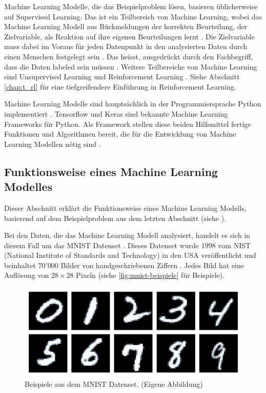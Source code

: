 Machine Learning Modelle, die das Beispielproblem lösen, basieren üblicherweise
auf Supervised Learning. Das ist ein Teilbereich von Machine Learning, wobei das
Machine Learning Modell aus Rückmeldungen der korrekten Beurteilung, der
Zielvariable, als Reaktion auf ihre eigenen Beurteilungen lernt
\cite{laurenz_wuttke_was_2021-1}. Die Zielvariable muss dabei im Voraus für jeden
Datenpunkt in den analysierten Daten durch einen Menschen festgelegt sein
\cite{trahasch_31_2020}. Das heisst, ausgedrückt durch den Fachbegriff, dass
die Daten labeled sein müssen \cite{luis_g_serrano_21_2021}. Weitere Teilbereiche
von Machine Learning sind Unsupervised Learning und Reinforcement Learning
\cite{arora_supervised_2020}. Siehe Abschnitt \ref{chap:t_rl} für eine
tiefgreifendere Einführung in Reinforcement Learning.
 
Machine Learning Modelle sind hauptsächlich in der Programmiersprache Python
implementiert \cite{sadie_bennett_why_2019}. Tensorflow und Keras sind bekannte
Machine Learning Frameworks für Python. Als Framework stellen diese beiden
Hilfsmittel fertige Funktionen und Algorithmen bereit, die für die Entwicklung
von Machine Learning Modellen nötig sind
\cite{noauthor_tensorflow_2015}\cite{noauthor_keras_2015}.
 
 
\subsection{Funktionsweise eines Machine Learning Modelles}\label{sub:t_ml_func}
Dieser Abschnitt erklärt die Funktionsweise eines Machine Learning Modells,
basierend auf dem Beispielproblem aus dem letzten Abschnitt (siehe ).
 
Bei den Daten, die das Machine Learning Modell analysiert, handelt es sich in
diesem Fall um das MNIST Datenset \cite{yann_lecun_mnist_nodate}. Dieses Datenset
wurde 1998 vom NIST (National Institute of Standards and Technology) in den USA
veröffentlicht und beinhaltet $70'000$ Bilder von handgeschriebenen Ziffern
\cite{yann_lecun_papers_nodate}. Jedes Bild hat eine Auflösung von $28\times28$
Pixeln (siehe \autoref{fig:mnist-beispiele} für Beispiele).
 
\begin{figure}[!ht]
   \centering
   \includegraphics[width=\textwidth]{images/theorie/mnist-beispiele.png}
   \caption{Beispiele aus dem MNIST Datenset. (Eigene Abbildung)}\label{fig:mnist-beispiele}
\end{figure}
 

